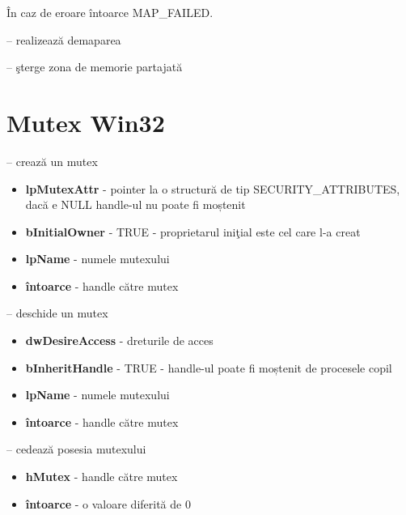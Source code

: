 \documentclass{refcard.cs.pub.ro}
\begin{document}
\begin{multicols*}{3}
În caz de eroare întoarce MAP_FAILED.

 -- realizează demaparea
\begin{params}
\end{params}

 -- şterge  zona de memorie partajată
\begin{params}
\end{params}

\section{ Mutex Win32}

 -- crează un mutex
\begin{itemize}
  \item \textbf{lpMutexAttr} - pointer la o structură de tip SECURITY_ATTRIBUTES, dacă e NULL handle-ul nu poate fi moștenit
  \item \textbf{bInitialOwner} - TRUE - proprietarul iniţial este cel care l-a creat
  \item \textbf{lpName} - numele mutexului
  \item \textbf{întoarce} - handle către mutex
\end{itemize}

 -- deschide un mutex
\begin{itemize}
  \item \textbf{dwDesireAccess} - dreturile de acces
  \item \textbf{bInheritHandle} - TRUE - handle-ul poate fi moștenit de procesele copil
  \item \textbf{lpName} - numele mutexului
  \item \textbf{întoarce} - handle către mutex
\end{itemize}

 -- cedează posesia mutexului
\begin{itemize}
  \item \textbf{hMutex} - handle către mutex
  \item \textbf{întoarce} - o valoare diferită de 0
\end{itemize}


\end{multicols*}
\end{document}
